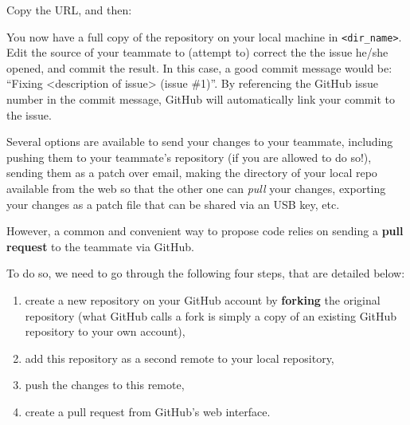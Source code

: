 \documentclass{instructions}
\begin{document}

Copy the URL, and then:


You now have a full copy of the repository on your local machine in
\texttt{<dir\_name>}. Edit the source of your teammate to (attempt to) correct the
the issue he/she opened, and commit the result.
In this case, a good commit message would be: ``Fixing <description of issue> (issue
\#1)''. By referencing the GitHub issue number in the commit message, GitHub will
automatically link your commit to the issue.

Several options are available to send your changes to your teammate, including
pushing them to your teammate's repository (if you are allowed to do so!),
sending them as a patch over email, making the directory of your local repo
available from the web so that the other one can \emph{pull} your changes,
exporting your changes as a patch file that can be shared via an USB key, etc.

However, a common and convenient way to propose code relies on sending a
\textbf{pull request} to the teammate via GitHub.

To do so, we need to go through the following four steps, that are detailed
below:

\begin{enumerate}
    \item create a new repository on your GitHub account by \textbf{forking} the
        original repository (what GitHub calls a fork is simply a copy of an
        existing GitHub repository to your own account),
    \item add this repository as a second remote to your local repository,
    \item push the changes to this remote,
    \item create a pull request from GitHub's web interface.
\end{enumerate}

\end{document}

